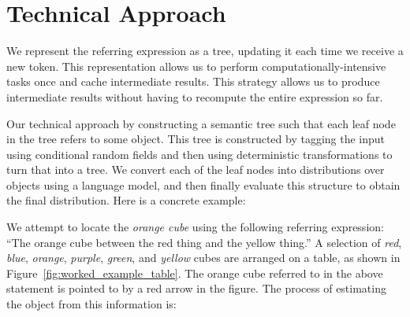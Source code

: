 \documentclass[letterpaper,10pt]{article}
\begin{document}
\section{Technical Approach}

We represent the referring expression as a tree, updating it each time we receive a new token. This representation allows us to perform computationally-intensive tasks once and cache intermediate results. This strategy allows us to produce intermediate results without having to recompute the entire expression so far.

Our technical approach by constructing a semantic tree such that each leaf node in the tree refers to some object. This tree is constructed by tagging the input using conditional random fields and then using deterministic transformations to turn that into a tree. We convert each of the leaf nodes into distributions over objects using a language model, and then finally evaluate this structure to obtain the final distribution. Here is a concrete example: 

We attempt to locate the \textit{orange cube} using the following referring expression: ``The orange cube between the red thing and the yellow thing.'' A selection of \textit{red}, \textit{blue}, \textit{orange}, \textit{purple}, \textit{green}, and  \textit{yellow} cubes are arranged on a table, as shown in Figure~\ref{fig:worked_example_table}. The orange cube referred to in the above statement is pointed to by a red arrow in the figure. The process of estimating the object from this information is:
\end{document}
